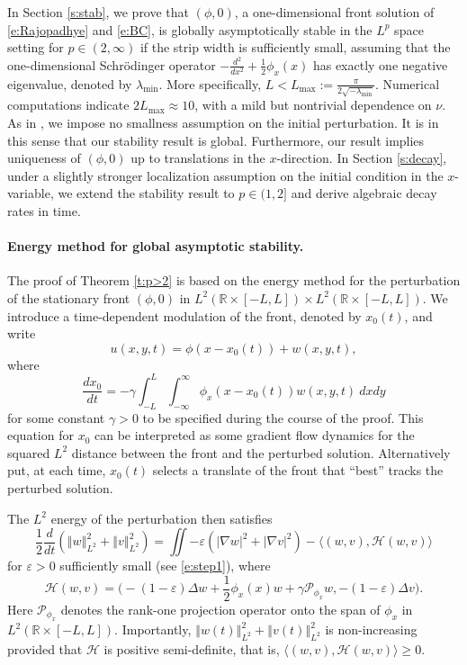\documentclass[final,11pt]{article}
\renewcommand{\geq}{\geqslant}
\theoremstyle{definition} %
\newcommand{\lv}{\left\Vert}
\newcommand{\rv}{\right\Vert}
\newcommand{\half}{\frac{1}{2}}
\newcommand{\R}{\mathbb{R}}
\theoremstyle{plain}
\theoremstyle{definition} %
\theoremstyle{remark}
\begin{document}
In Section \ref{s:stab}, we prove that $(\phi,0)$, a one-dimensional front solution of \eqref{e:Rajopadhye} and \eqref{e:BC}, is globally asymptotically stable in the $L^p$ space setting for $p\in(2,\infty)$ if the strip width is sufficiently small, assuming that the one-dimensional Schr\"odinger operator $-\frac{d^2}{dx^2}+\frac12\phi_x(x)$ has exactly one negative eigenvalue, denoted by $\lambda_{\min}$. More specifically, $L<L_{\max}:=\frac{\pi}{2\sqrt{-\lambda_{\min}}}$. Numerical computations indicate $2L_{\max}\approx10$, with a mild but nontrivial dependence on $\nu$. As in \cite{BARKER2025}, we impose no smallness assumption on the initial perturbation. It is in this sense that our stability result is global. Furthermore, our result implies uniqueness of $(\phi,0)$ up to translations in the $x$-direction. In Section \ref{s:decay}, under a slightly stronger localization assumption on the initial condition in the $x$-variable, we extend the stability result to $p\in(1,2]$ and derive algebraic decay rates in time.  

\paragraph{Energy method for global asymptotic stability.} 
The proof of Theorem \ref{t:p>2} is based on the energy method for the perturbation of the stationary front $(\phi,0)$ in $L^2(\R\times[-L,L])\times L^2(\R\times[-L,L])$. We introduce a time-dependent modulation of the front, denoted by $x_0(t)$, and write 
\[
u(x,y,t)=\phi(x-x_0(t))+w(x,y,t),
\]
where 
\[
\frac{dx_0}{dt} = -\gamma \int_{-L}^L\int_{-\infty}^\infty \phi_x(x-x_0(t))w(x,y,t)~dxdy
\]
for some constant $\gamma>0$ to be specified during the course of the proof. This equation for $x_0$ can be interpreted as some gradient flow dynamics for the squared $L^2$ distance between the front and the perturbed solution. Alternatively put, at each time, $x_0(t)$ selects a translate of the front that ``best'' tracks the perturbed solution. 

The $L^2$ energy of the perturbation then satisfies
\[ 
\half\frac{d}{dt}(\lv w \rv_{L^2} ^ {2} + \lv v \rv_{L^2}^{2}) =  \iint - \varepsilon(|\nabla w| ^ { 2 } + |\nabla v| ^ { 2 }) - \langle (w,v) , \mathcal{H}(w,v) \rangle
\]
for $\varepsilon>0$ sufficiently small (see \eqref{e:step1}), where 
\[ 
\mathcal{H}(w,v) = \Big(-(1-\varepsilon)\Delta w + \frac{1}{2}\phi_x(x)w + \gamma \mathcal{P}_{\phi_x} w, -(1-\varepsilon)\Delta v\Big). 
\] 
Here $\mathcal{P}_{\phi_x}$ denotes the rank-one projection operator onto the span of $\phi_x$ in $L^2(\mathbb{R}\times [-L,L])$. Importantly, $\lv w(t)\rv_{L^2}^2+\lv v(t)\rv_{L^2}^2$ is non-increasing provided that $\mathcal{H}$ is positive semi-definite, that is, $\langle(w,v),\mathcal{H}(w,v)\rangle\geq0$. 
\end{document}
